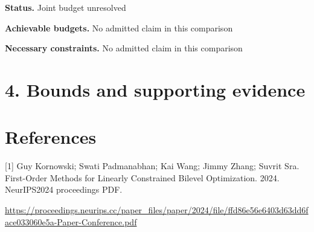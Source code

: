 \documentclass[10pt,a4paper]{article}
\begin{document}
\textbf{Status.} Joint budget unresolved

\textbf{Achievable budgets.} No admitted claim in this comparison

\textbf{Necessary constraints.} No admitted claim in this comparison

\section{4. Bounds and supporting evidence}
\section{References}
[1] Guy Kornowski; Swati Padmanabhan; Kai Wang; Jimmy Zhang; Suvrit Sra. First-Order Methods for Linearly Constrained Bilevel Optimization. 2024. NeurIPS2024 proceedings PDF.

\url{https://proceedings.neurips.cc/paper_files/paper/2024/file/ffd86e56e6403d63dd6face033060e5a-Paper-Conference.pdf}
\end{document}
